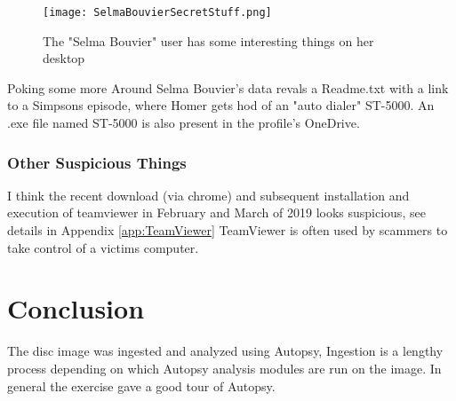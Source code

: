 \documentclass[
	letterpaper, %
	10pt, %
	unnumberedsections, %
	twoside, %
]{APAAssignment}
\begin{document}
\begin{figure}[!ht] %
	\centering
	\texttt{[image: SelmaBouvierSecretStuff.png]}
	\caption{The "Selma Bouvier" user has some interesting things on her desktop}
	\label{fig:SelmaBouvierSecredStuff}
\end{figure}


Poking some more Around Selma Bouvier's data revals a Readme.txt with a link to a Simpsons episode, where Homer gets hod of an "auto dialer" ST-5000. An .exe file named ST-5000 is also present in the profile's OneDrive.
\subsubsection{Other Suspicious Things}
I think the recent download (via chrome) and subsequent installation and execution of teamviewer in February and March of 2019 looks suspicious, see details in Appendix \ref{app:TeamViewer} TeamViewer is often used by scammers to take control of a victims computer.


\section{Conclusion}
The disc image was ingested and analyzed using Autopsy, Ingestion is a lengthy process depending on which Autopsy analysis modules are run on the image. In general the exercise gave a good tour of Autopsy.




\clearpage
\printbibliography %




%


\clearpage
\end{document}
